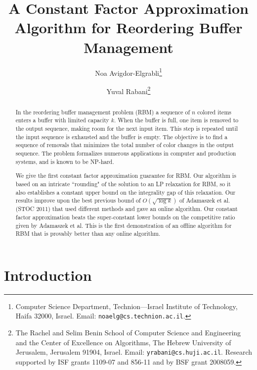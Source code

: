 \documentclass[11pt]{article}
\begin{document}
\title{A Constant Factor Approximation Algorithm for
Reordering Buffer Management}

\author{Noa Avigdor-Elgrabli\thanks{Computer Science Department,
Technion---Israel Institute of Technology, Haifa 32000, Israel.
Email: {\tt noaelg@cs.technion.ac.il}.}
\and
Yuval Rabani\thanks{The Rachel and Selim Benin School of
Computer Science and Engineering and the Center of Excellence
on Algorithms, The Hebrew University of Jerusalem, Jerusalem
91904, Israel. Email: {\tt yrabani@cs.huji.ac.il}.
Research supported by ISF grants 1109-07 and 856-11 and
by BSF grant 2008059.}
}

\date{}

\setcounter{footnote}{3}
\maketitle

\begin{abstract}
In the reordering buffer management problem (RBM) a sequence
of $n$ colored items enters a buffer with limited capacity $k$.
When the buffer is full, one item is removed to the output sequence,
making room for the next input item. This step is repeated until
the input sequence is exhausted and the buffer is empty. The
objective is to find a sequence of removals that minimizes the
total number of color changes in the output sequence. The
problem formalizes numerous applications in computer and
production systems, and is known to be NP-hard.

We give the first constant factor approximation guarantee for RBM.
Our algorithm is based on an intricate ``rounding" of the solution
to an LP relaxation for RBM, so it also establishes a constant upper
bound on the integrality gap of this relaxation. Our results improve
upon the best previous bound of $O(\sqrt{\log k})$ of Adamaszek
et al. (STOC 2011) that used different methods and gave an online
algorithm. Our constant factor approximation beats the super-constant
lower bounds on the competitive ratio given by Adamaszek et al. This
is the first demonstration of an offline algorithm for RBM that is provably
better than any online algorithm.
\end{abstract}

\thispagestyle{empty}
\newpage
\setcounter{page}{1}

\section{Introduction}
\end{document}
